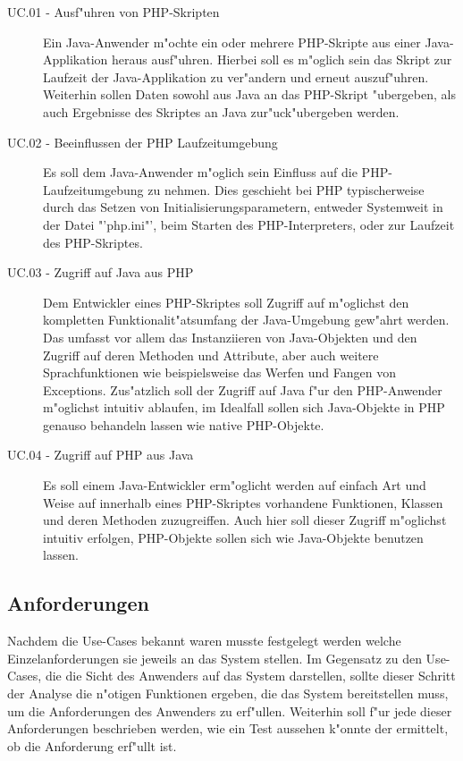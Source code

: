 \begin{description}
    \item[UC.01 - Ausf"uhren von PHP-Skripten] Ein Java-Anwender m"ochte ein oder mehrere PHP-Skripte aus einer
        Java-Applikation heraus ausf"uhren. Hierbei soll es m"oglich sein das Skript zur Laufzeit der Java-Applikation
        zu ver"andern und erneut auszuf"uhren. Weiterhin sollen Daten sowohl aus Java an das PHP-Skript "ubergeben, als
        auch Ergebnisse des Skriptes an Java zur"uck"ubergeben werden.
    \item[UC.02 - Beeinflussen der PHP Laufzeitumgebung] Es soll dem Java-Anwender m"oglich sein Einfluss auf die PHP-Laufzeitumgebung
        zu nehmen. Dies geschieht bei PHP typischerweise durch das Setzen von Initialisierungsparametern, entweder Systemweit
        in der Datei "'php.ini"', beim Starten des PHP-Interpreters, oder zur Laufzeit des PHP-Skriptes.
    \item[UC.03 - Zugriff auf Java aus PHP] Dem Entwickler eines PHP-Skriptes soll Zugriff auf m"oglichst den kompletten 
        Funktionalit"atsumfang der Java-Umgebung gew"ahrt werden. Das umfasst vor allem das Instanziieren von Java-Objekten und
        den Zugriff auf deren Methoden und Attribute, aber auch weitere Sprachfunktionen wie beispielsweise das Werfen und 
        Fangen von Exceptions. Zus"atzlich soll der Zugriff auf Java f"ur den PHP-Anwender m"oglichst intuitiv ablaufen, im
        Idealfall sollen sich Java-Objekte in PHP genauso behandeln lassen wie native PHP-Objekte.
    \item[UC.04 - Zugriff auf PHP aus Java] Es soll einem Java-Entwickler erm"oglicht werden auf einfach Art und Weise auf
        innerhalb eines PHP-Skriptes vorhandene Funktionen, Klassen und deren Methoden zuzugreiffen. Auch hier soll
        dieser Zugriff m"oglichst intuitiv erfolgen, PHP-Objekte sollen sich wie Java-Objekte benutzen lassen. 
\end{description}

\subsection{Anforderungen}
\label{sec:chap1:ana:ap}

Nachdem die Use-Cases bekannt waren musste festgelegt werden welche Einzelanforderungen sie jeweils an das System stellen.
Im Gegensatz zu den Use-Cases, die die Sicht des Anwenders auf das System darstellen, sollte dieser Schritt der Analyse
die n"otigen Funktionen ergeben, die das System bereitstellen muss, um die Anforderungen des Anwenders zu erf"ullen.
Weiterhin soll f"ur jede dieser Anforderungen beschrieben werden, wie ein Test aussehen k"onnte der ermittelt, ob die 
Anforderung erf"ullt ist.

